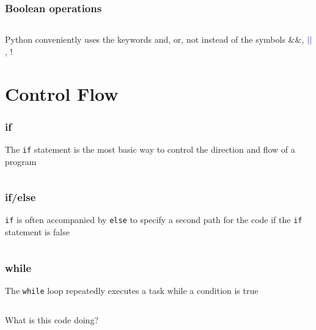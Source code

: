 \documentclass{beamer}
\begin{document}
\begin{frame}
\frametitle{Boolean operations}

\begin{center}
\begin{tabular}{c}

\end{tabular}
\end{center}

Python conveniently uses the keywords \textcolor{theblue}{and}, \textcolor{theblue}{or}, \textcolor{theblue}{not} instead of the symbols \textcolor{theblue}{\&\&}, $\textcolor{theblue}{||}$, \textcolor{theblue}{!}

\end{frame}


\section{Control Flow}
\begin{frame}
\frametitle{if}
The \texttt{if} statement is the most basic way to control the direction and flow of a program

\begin{center}
\begin{tabular}{c}

\end{tabular}
\end{center}

\end{frame}


\begin{frame}
\frametitle{if/else}
\texttt{if} is often accompanied by \texttt{else} to specify a second path for the code if the \texttt{if} statement is false

\begin{center}
\begin{tabular}{c}

\end{tabular}
\end{center}

\end{frame}


\begin{frame}
\frametitle{while}
The \texttt{while} loop repeatedly executes a task while a condition is true

\begin{center}
\begin{tabular}{c}

\end{tabular}
\end{center}

What is this code doing?

\end{frame}
\end{document}

